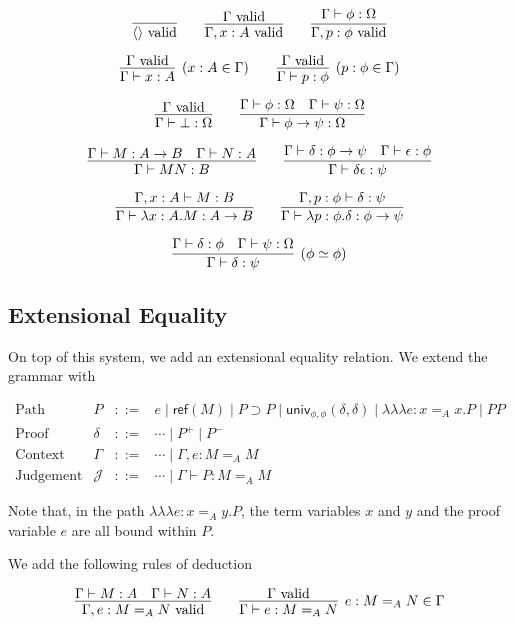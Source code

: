 \documentclass{easychair}
\newcommand{\vald}{\ \mathrm{valid}}
\newcommand{\univ}[4]{\mathsf{univ}_{{#1},{#2}} \left( {#3} , {#4} \right)}
\newcommand{\triplelambda}{\lambda \!\! \lambda \!\! \lambda}
\newcommand{\reff}[1]{\mathsf{ref} \left( {#1} \right)}
\begin{document}
\[ \infer{\langle \rangle \vald}{} \qquad
\infer{\Gamma, x : A \vald}{\Gamma \vald} \qquad 
\infer{\Gamma, p : \phi \vald}{\Gamma \vdash \phi : \Omega} \]

\[ \infer[(x : A \in \Gamma)]{\Gamma \vdash x : A}{\Gamma \vald} \qquad
\infer[(p : \phi \in \Gamma)]{\Gamma \vdash p : \phi}{\Gamma \vald} \]

\[ \infer{\Gamma \vdash \bot : \Omega}{\Gamma \vald} \qquad
\infer{\Gamma \vdash \phi \rightarrow \psi : \Omega}{\Gamma \vdash \phi : \Omega \quad \Gamma \vdash \psi : \Omega} \]

\[ \infer{\Gamma \vdash M N : B} {\Gamma \vdash M : A \rightarrow B \quad \Gamma \vdash N : A} \qquad
\infer{\Gamma \vdash \delta \epsilon : \psi} {\Gamma \vdash \delta : \phi \rightarrow \psi \quad \Gamma \vdash \epsilon : \phi} \]

\[ \infer{\Gamma \vdash \lambda x:A.M : A \rightarrow B}{\Gamma, x : A \vdash M : B} \qquad
\infer{\Gamma \vdash \lambda p : \phi . \delta : \phi \rightarrow \psi}{\Gamma, p : \phi \vdash \delta : \psi} \]

\[ \infer[(\phi \simeq \phi)]{\Gamma \vdash \delta : \psi}{\Gamma \vdash \delta : \phi \quad \Gamma \vdash \psi : \Omega} \]

\subsection{Extensional Equality}

On top of this system, we add an extensional equality relation.  We extend the grammar with

\[
\begin{array}{lrcl}
\text{Path} & P & ::= & e \mid \reff{M} \mid P \supset P \mid \univ{\phi}{\phi}{\delta}{\delta} \mid \triplelambda e : x =_A x . P \mid P P\\
\text{Proof} & \delta & ::= & \cdots \mid P^+ \mid P^- \\
\text{Context} & \Gamma & ::= & \cdots \mid \Gamma, e : M =_A M \\
\text{Judgement} & \mathcal{J} & ::= & \cdots \mid \Gamma \vdash P : M =_A M
\end{array}
\]

Note that, in the path $\triplelambda e : x =_A y . P$, the term variables $x$ and $y$ and the proof variable $e$ are all bound within $P$.

We add the following rules of deduction

\[ \infer{\Gamma, e : M =_A N \vald}{\Gamma \vdash M : A \quad \Gamma \vdash N : A}
\qquad
\infer[e : M =_A N \in \Gamma]{\Gamma \vdash e : M =_A N}{\Gamma \vald} \]
\end{document}
